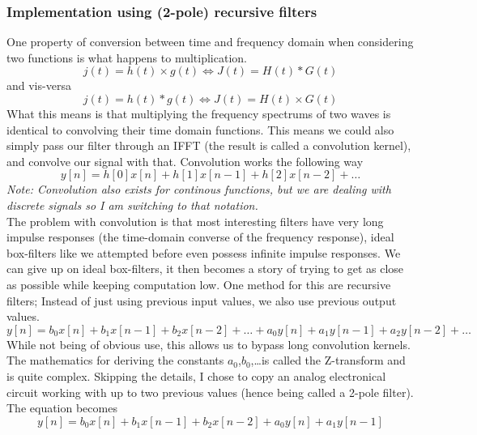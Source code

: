 \documentclass[11pt,a4paper]{article}
\begin{document}
\subsubsection{Implementation using (2-pole) recursive filters}

One property of conversion between time and frequency domain when considering two functions is what happens to multiplication.
\begin{equation}
j(t) = h(t) \times g(t) \iff J(t) = H(t) * G(t)
\end{equation}
and vis-versa
\begin{equation}
j(t) = h(t) * g(t) \iff J(t) = H(t) \times G(t)
\end{equation}
What this means is that multiplying the frequency spectrums of two waves is identical to convolving their time domain functions.
This means we could also simply pass our filter through an IFFT (the result is called a convolution kernel), and convolve our signal with that.
Convolution works the following way
\begin{equation}
y[n] = h[0]x[n] + h[1]x[n-1] + h[2]x[n-2] + \dots
\end{equation}
{\small \it Note: Convolution also exists for continous functions, but we are dealing with discrete signals so I am switching to that notation.}\\
The problem with convolution is that most interesting filters have very long impulse responses (the time-domain converse of the frequency response), ideal box-filters like we attempted before even possess infinite impulse responses.
We can give up on ideal box-filters, it then becomes a story of trying to get as close as possible while keeping computation low. One method for this are recursive filters; Instead of just using previous input values, we also use previous output values.
\begin{equation}
y[n] = b_0x[n] + b_1x[n-1] + b_2x[n-2] + \dots + a_0y[n] + a_1y[n-1] + a_2y[n-2] + \dots
\end{equation}
While not being of obvious use, this allows us to bypass long convolution kernels. The mathematics for deriving the constants $a_0$,$b_0$,\dots is called the Z-transform and is quite complex. Skipping the details, I chose to copy an analog electronical circuit working with up to two previous values (hence being called a 2-pole filter).
The equation becomes
\begin{equation}
y[n] = b_0x[n] + b_1x[n-1] + b_2x[n-2] + a_0y[n] + a_1y[n-1]
\end{equation}
\end{document}
